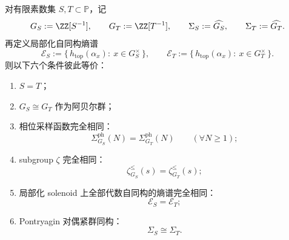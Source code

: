 \begin{theorem}[有限素支撑局部化数系的六重刚性]\label{thm:conclusion-finite-localization-sixfold-rigidity}
对有限素数集 \(S,T\subset\mathbb P\)，记
\[
G_S:=\ZZ[S^{-1}],
\qquad
G_T:=\ZZ[T^{-1}],
\qquad
\Sigma_S:=\widehat{G_S},
\qquad
\Sigma_T:=\widehat{G_T}.
\]
再定义局部化自同构熵谱
\[
\mathscr E_S:=\{\,h_{\mathrm{top}}(\alpha_x):\ x\in G_S^\times\,\},
\qquad
\mathscr E_T:=\{\,h_{\mathrm{top}}(\alpha_x):\ x\in G_T^\times\,\}.
\]
则以下六个条件彼此等价：
\begin{enumerate}
\item \(S=T\)；
\item \(G_S\cong G_T\) 作为阿贝尔群；
\item 相位采样函数完全相同：
\[
\Sigma^{\mathrm{ph}}_{G_S}(N)=\Sigma^{\mathrm{ph}}_{G_T}(N)
\qquad (\forall N\ge 1);
\]
\item subgroup \(\zeta\) 完全相同：
\[
\zeta_{G_S}^{\le}(s)=\zeta_{G_T}^{\le}(s);
\]
\item 局部化 solenoid 上全部代数自同构的熵谱完全相同：
\[
\mathscr E_S=\mathscr E_T;
\]
\item Pontryagin 对偶紧群同构：
\[
\Sigma_S\cong \Sigma_T.
\]
\end{enumerate}
\end{theorem}
